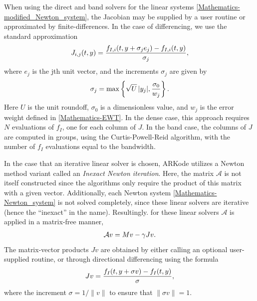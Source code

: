\documentclass[letterpaper,10pt,english]{sphinxmanual}
\begin{document}
When using the direct and band solvers for the linear systems
\eqref{Mathematics-modified_Newton_system}, the Jacobian may be supplied by a user
routine or approximated by finite-differences.  In the case of
differencing, we use the standard approximation
\begin{gather}
\begin{split}J_{i,j}(t,y) = \frac{f_{I,i}(t,y+\sigma_j e_j) - f_{I,i}(t,y)}{\sigma_j},\end{split}\notag
\end{gather}
where \(e_j\) is the jth unit vector, and the increments
\(\sigma_j\) are given by
\begin{gather}
\begin{split}\sigma_j = \max\left\{ \sqrt{U}\, |y_j|, \frac{\sigma_0}{w_j} \right\}.\end{split}\notag
\end{gather}
Here \(U\) is the unit roundoff, \(\sigma_0\) is a
dimensionless value, and \(w_j\) is the error weight defined in
\eqref{Mathematics-EWT}.  In the dense case, this approach requires \(N\)
evaluations of \(f_I\), one for each column of \(J\).  In the
band case, the columns of \(J\) are computed in groups, using the
Curtis-Powell-Reid algorithm, with the number of \(f_I\)
evaluations equal to the bandwidth.

In the case that an iterative linear solver is chosen, ARKode utilizes a
Newton method variant called an \emph{Inexact Newton iteration}.  Here, the
matrix \({\mathcal A}\) is not itself constructed since the
algorithms only require the product of this matrix with a given
vector.  Additionally, each Newton system \eqref{Mathematics-Newton_system} is not
solved completely, since these linear solvers are iterative (hence the
``inexact'' in the name). Resultingly. for these linear solvers
\({\mathcal A}\) is applied in a matrix-free manner,
\begin{gather}
\begin{split}{\mathcal A}v = Mv - \gamma Jv.\end{split}\notag
\end{gather}
The matrix-vector products \(Jv\) are obtained by either calling
an optional user-supplied routine, or through directional differencing
using the formula
\begin{gather}
\begin{split}Jv = \frac{f_I(t,y+\sigma v) - f_I(t,y)}{\sigma},\end{split}\notag
\end{gather}
where the increment \(\sigma = 1/\|v\|\) to ensure that
\(\|\sigma v\| = 1\).
\end{document}
